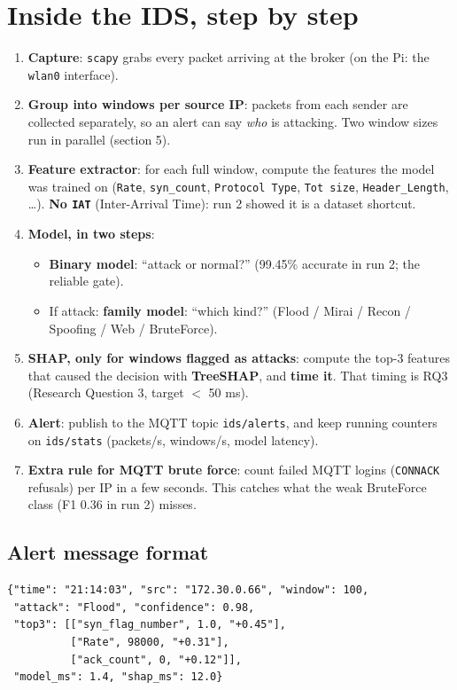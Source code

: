 \documentclass[11pt]{article}
\begin{document}
\section{Inside the IDS, step by step}
\begin{enumerate}
\item \textbf{Capture}: \texttt{scapy} grabs every packet arriving at the broker (on the Pi: the \texttt{wlan0} interface).
\item \textbf{Group into windows per source IP}: packets from each sender are collected separately, so an alert can say \emph{who} is attacking.
Two window sizes run in parallel (section 5).
\item \textbf{Feature extractor}: for each full window, compute the features the model was trained on (\texttt{Rate}, \texttt{syn\_count},
\texttt{Protocol Type}, \texttt{Tot size}, \texttt{Header\_Length}, \dots). \textbf{No \texttt{IAT}} (Inter-Arrival Time): run 2 showed it is a dataset shortcut.
\item \textbf{Model, in two steps}:
\begin{itemize}
\item \textbf{Binary model}: ``attack or normal?'' (99.45\% accurate in run 2; the reliable gate).
\item If attack: \textbf{family model}: ``which kind?'' (Flood / Mirai / Recon / Spoofing / Web / BruteForce).
\end{itemize}
\item \textbf{SHAP, only for windows flagged as attacks}: compute the top-3 features that caused the decision with \textbf{TreeSHAP},
and \textbf{time it}. That timing is RQ3 (Research Question 3, target $<$ 50 ms).
\item \textbf{Alert}: publish to the MQTT topic \texttt{ids/alerts}, and keep running counters on \texttt{ids/stats} (packets/s, windows/s, model latency).
\item \textbf{Extra rule for MQTT brute force}: count failed MQTT logins (\texttt{CONNACK} refusals) per IP in a few seconds.
This catches what the weak BruteForce class (F1 0.36 in run 2) misses.
\end{enumerate}

\subsection*{Alert message format}
{\small
\begin{verbatim}
{"time": "21:14:03", "src": "172.30.0.66", "window": 100,
 "attack": "Flood", "confidence": 0.98,
 "top3": [["syn_flag_number", 1.0, "+0.45"],
          ["Rate", 98000, "+0.31"],
          ["ack_count", 0, "+0.12"]],
 "model_ms": 1.4, "shap_ms": 12.0}
\end{verbatim}
}
\end{document}
